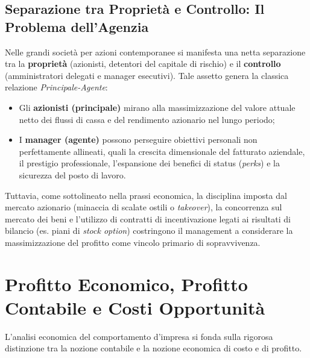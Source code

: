 \subsection{Separazione tra Proprietà e Controllo: Il Problema dell'Agenzia}
Nelle grandi società per azioni contemporanee si manifesta una netta separazione tra la \textbf{proprietà} (azionisti, detentori del capitale di rischio) e il \textbf{controllo} (amministratori delegati e manager esecutivi). Tale assetto genera la classica relazione \textit{Principale-Agente}:
\begin{itemize}
    \item Gli \textbf{azionisti (principale)} mirano alla massimizzazione del valore attuale netto dei flussi di cassa e del rendimento azionario nel lungo periodo;
    \item I \textbf{manager (agente)} possono perseguire obiettivi personali non perfettamente allineati, quali la crescita dimensionale del fatturato aziendale, il prestigio professionale, l'espansione dei benefici di status (\textit{perks}) e la sicurezza del posto di lavoro.
\end{itemize}
Tuttavia, come sottolineato nella prassi economica, la disciplina imposta dal mercato azionario (minaccia di scalate ostili o \textit{takeover}), la concorrenza sul mercato dei beni e l'utilizzo di contratti di incentivazione legati ai risultati di bilancio (es. piani di \textit{stock option}) costringono il management a considerare la massimizzazione del profitto come vincolo primario di sopravvivenza.

\section{Profitto Economico, Profitto Contabile e Costi Opportunità}

L'analisi economica del comportamento d'impresa si fonda sulla rigorosa distinzione tra la nozione contabile e la nozione economica di costo e di profitto.

